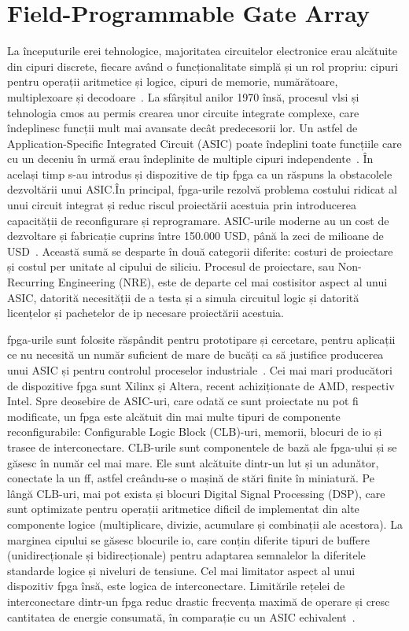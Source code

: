 \documentclass[12pt,a4paper]{report}
\begin{document}
\section{Field-Programmable Gate Array}
La începuturile erei tehnologice, majoritatea circuitelor electronice erau alcătuite din cipuri discrete, fiecare având o funcționalitate simplă și un rol propriu: cipuri pentru operații aritmetice și logice, cipuri de memorie, numărătoare, multiplexoare și decodoare~\cite{74series}. La sfârșitul anilor 1970 însă, procesul \gls{vlsi} și tehnologia \gls{cmos} au permis crearea unor circuite integrate complexe, care îndeplinesc funcții mult mai avansate decât predecesorii lor. Un astfel de Application-Specific Integrated Circuit (ASIC) poate îndeplini toate funcțiile care cu un deceniu în urmă erau îndeplinite de multiple cipuri independente~\cite{intel_4004}\cite{zilog_z80}. În același timp s-au introdus și dispozitive de tip \gls{fpga} ca un răspuns la obstacolele dezvoltării unui ASIC.\@ În principal, \gls{fpga}-urile rezolvă problema costului ridicat al unui circuit integrat și reduc riscul proiectării acestuia prin introducerea capacității de reconfigurare și reprogramare. ASIC-urile moderne au un cost de dezvoltare și fabricație cuprins între 150.000 USD, până la zeci de milioane de USD~\cite{asic_costs_1}\cite{asic_costs_2}. Această sumă se desparte în două categorii diferite: costuri de proiectare și costul per unitate al cipului de siliciu. Procesul de proiectare, sau Non-Recurring Engineering (NRE), este de departe cel mai costisitor aspect al unui ASIC, datorită necesității de a testa și a simula circuitul logic și datorită licențelor și pachetelor de \gls{ip} necesare proiectării acestuia.

\gls{fpga}-urile sunt folosite răspândit pentru prototipare și cercetare, pentru aplicații ce nu necesită un număr suficient de mare de bucăți ca să justifice producerea unui ASIC și pentru controlul proceselor industriale~\cite{basic_fpga}. Cei mai mari producători de dispozitive \gls{fpga} sunt Xilinx și Altera, recent achiziționate de AMD, respectiv Intel. Spre deosebire de ASIC-uri, care odată ce sunt proiectate nu pot fi modificate, un \gls{fpga} este alcătuit din mai multe tipuri de componente reconfigurabile: Configurable Logic Block (CLB)-uri, memorii, blocuri de \gls{io} și trasee de interconectare. CLB-urile sunt componentele de bază ale \gls{fpga}-ului și se găsesc în număr cel mai mare. Ele sunt alcătuite dintr-un \gls{lut} și un adunător, conectate la un \gls{ff}, astfel creându-se o mașină de stări finite în miniatură. Pe lângă CLB-uri, mai pot exista și blocuri Digital
Signal Processing (DSP), care sunt optimizate pentru operații aritmetice dificil de implementat din alte componente logice (multiplicare, divizie, acumulare și combinații ale acestora). La marginea cipului se găsesc blocurile \gls{io}, care conțin diferite tipuri de buffere (unidirecționale și bidirecționale) pentru adaptarea semnalelor la diferitele standarde logice și niveluri de tensiune. Cel mai limitator aspect al unui dispozitiv \gls{fpga} însă, este logica de interconectare. Limitările rețelei de interconectare dintr-un \gls{fpga} reduc drastic frecvența maximă de operare și cresc cantitatea de energie consumată, în comparație cu un ASIC echivalent~\cite{fpga_book}.
\end{document}
